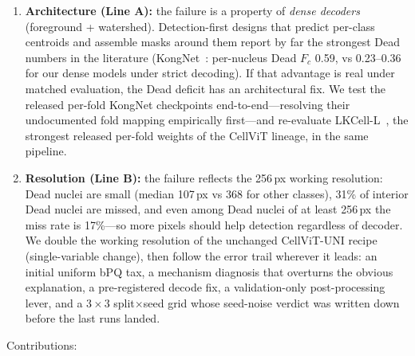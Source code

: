 \documentclass[11pt]{article}
\begin{document}
\begin{enumerate}
\item \textbf{Architecture (Line A):} the failure is a property of \emph{dense decoders}
(foreground + watershed). Detection-first designs that predict per-class centroids and
assemble masks around them report by far the strongest Dead numbers in the literature
(KongNet~\cite{lv2025kongnet}: per-nucleus Dead $F_c$ 0.59, vs 0.23--0.36 for our dense
models under strict decoding). If that advantage is real under matched evaluation, the Dead
deficit has an architectural fix. We test the released per-fold KongNet checkpoints
end-to-end---resolving their undocumented fold mapping empirically first---and re-evaluate
LKCell-L~\cite{cui2024lkcell}, the strongest released per-fold weights of the CellViT
lineage, in the same pipeline.
\item \textbf{Resolution (Line B):} the failure reflects the 256\,px working resolution:
Dead nuclei are small (median 107\,px vs 368 for other classes), 31\% of interior Dead nuclei
are missed, and even among Dead nuclei of at least 256\,px the miss rate is 17\%---so more
pixels should help detection regardless of decoder. We double the working resolution of the
unchanged CellViT-UNI recipe (single-variable change), then follow the error trail wherever
it leads: an initial uniform bPQ tax, a mechanism diagnosis that overturns the obvious
explanation, a pre-registered decode fix, a validation-only post-processing lever, and a
$3{\times}3$ split$\times$seed grid whose seed-noise verdict was written down before the last
runs landed.
\end{enumerate}

Contributions:
\end{document}

